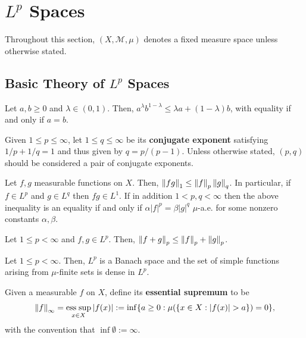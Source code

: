 \documentclass[11pt]{article}
\newcommand{\M}{\mathcal{M}}
\DeclareMathOperator{\esssup}{ess\;sup} %
\begin{document}
\section{$L^p$ Spaces}
Throughout this section, $(X,\M,\mu)$ denotes a fixed measure space unless otherwise stated.

\subsection{Basic Theory of $L^p$ Spaces}
\begin{lemma}
Let $a,b\geq0$ and $\lambda\in(0,1)$. Then, $a^{\lambda}b^{1-\lambda}\leq\lambda a+(1-\lambda)b$, with equality if and only if $a=b$.
\end{lemma}

Given $1\leq p\leq\infty$, let $1\leq q\leq\infty$ be its \textbf{conjugate exponent} satisfying $1/p+1/q=1$ and thus given by $q=p/(p-1)$. Unless otherwise stated, $(p,q)$ should be considered a pair of conjugate exponents.

\begin{proposition}
Let $f,g$ measurable functions on $X$. Then, $\left\lVert fg\right\rVert_1\leq\left\lVert f\right\rVert_p\left\lVert g\right\rVert_q$. In particular, if $f\in L^p$ and $g\in L^q$ then $fg\in L^1$. If in addition $1<p,q<\infty$ then the above inequality is an equality if and only if $\alpha|f|^p=\beta|g|^q$ $\mu$-a.e. for some nonzero constants $\alpha,\beta$.
\end{proposition}

\begin{proposition}
Let $1\leq p<\infty$ and $f,g\in L^p$. Then, $\left\lVert f+g\right\rVert_p\leq\left\lVert f\right\rVert_p+\left\lVert g\right\rVert_p$.
\end{proposition}

\begin{theorem}
Let $1\leq p<\infty$. Then, $L^p$ is a Banach space and the set of simple functions arising from $\mu$-finite sets is dense in $L^p$.
\end{theorem}

Given a measurable $f$ on $X$, define its \textbf{essential supremum} to be 
\begin{align*}
\norm{f}_{\infty}
=\esssup_{x\in X}|f(x)|
:=\inf\{a\geq0 : \mu(\{x\in X : |f(x)|>a\})=0\},
\end{align*}
with the convention that $\inf\emptyset:=\infty$.
\end{document}
